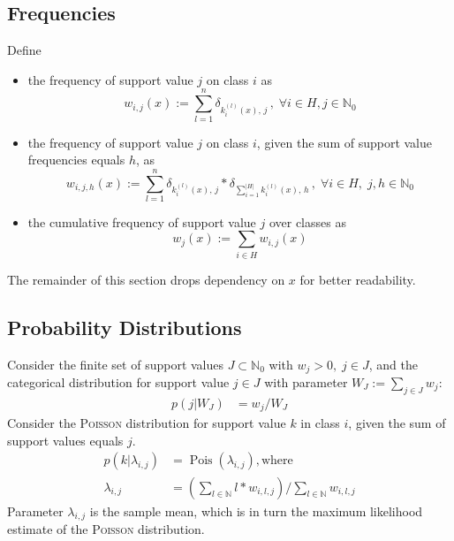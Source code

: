 \documentclass{article}
\begin{document}
\subsection{Frequencies}
Define
\begin{itemize}
  \item the frequency of support value $j$ on class $i$ as 
    \begin{equation}
        w_{i,j}(x):=\sum_{l=1}^n \delta_{k_i^{(l)}(x),\, j}\, , \; \forall i \in H, j \in \mathbb{N}_0
    \end{equation}
  \item the frequency of support value $j$ on class $i$, given the sum of support value frequencies equals $h$, as 
    \begin{equation}
      w_{i,j,h}(x):=\sum_{l=1}^n \delta_{k_i^{(l)}(x),\, j} * \delta_{\sum_{i=1}^{\vert H \vert}k_i^{(l)}(x),\, h}\, , \; \forall i \in H, \; j,h \in \mathbb{N}_0
    \end{equation}
  \item the cumulative frequency of support value $j$ over classes as 
    \begin{equation}
      w_j(x):=\sum_{i \in H}w_{i,j}(x)
    \end{equation}
\end{itemize}
The remainder of this section drops dependency on $x$ for better readability.

\subsection{Probability Distributions}
Consider the finite set of support values $J \subset \mathbb{N}_0$ with $w_j > 0, \; j \in J$, and the categorical distribution for support value $j \in J$ with parameter $W_J:=\sum_{j \in J} w_j$:
\begin{align}
  p(j|W_J) &= w_j/W_J
\end{align}
Consider the \textsc{Poisson} distribution for support value $k$ in class $i$, given the sum of support values equals $j$.
\begin{align}
  p(k\vert\lambda_{i,j}) &= \operatorname{Pois}\left(\lambda_{i,j}\right), \text{where}\\
  \lambda_{i,j}&=\left( \sum_{l \in \mathbb{N}} l*w_{i,l,j} \right) / \sum_{l \in \mathbb{N}} w_{i,l,j}
\end{align}
Parameter $\lambda_{i,j}$ is the sample mean, which is in turn the maximum likelihood estimate of the \textsc{Poisson} distribution.
\end{document}
